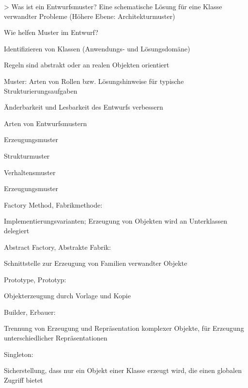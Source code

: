 \documentclass[a4paper]{article}
\begin{document}
\begin{multicols}{3}
  > Was ist ein Entwurfsmuster? Eine schematische Lösung für eine Klasse verwandter Probleme (Höhere Ebene: Architekturmuster)
  \begin{itemize*}
    \item Wie helfen Muster im Entwurf?
          \begin{itemize*}
            \item Identifizieren von Klassen (Anwendungs- und Lösungsdomäne)
            \item Regeln sind abstrakt oder an realen Objekten orientiert
            \item Muster: Arten von Rollen bzw. Lösungshinweise für typische Strukturierungsaufgaben
            \item Änderbarkeit und Lesbarkeit des Entwurfs verbessern
          \end{itemize*}
    \item Arten von Entwurfsmustern
          \begin{itemize*}
            \item Erzeugungsmuster
            \item Strukturmuster
            \item Verhaltensmuster
          \end{itemize*}
    \item Erzeugungsmuster
          \begin{itemize*}
            \item Factory Method, Fabrikmethode:
            \item Implementierungsvarianten; Erzeugung von Objekten wird an Unterklassen delegiert
            \item Abstract Factory, Abstrakte Fabrik:
            \item Schnittstelle zur Erzeugung von Familien verwandter Objekte
            \item Prototype, Prototyp:
            \item Objekterzeugung durch Vorlage und Kopie
            \item Builder, Erbauer:
            \item Trennung von Erzeugung und Repräsentation komplexer Objekte, für Erzeugung unterschiedlicher Repräsentationen
            \item Singleton:
            \item Sicherstellung, dass nur ein Objekt einer Klasse erzeugt wird, die einen globalen Zugriff bietet
          \end{itemize*}
  \end{itemize*}


\end{multicols}
\end{document}
